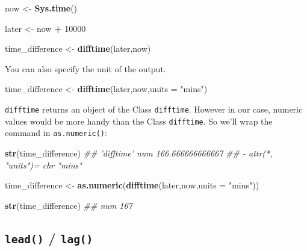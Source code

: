 \documentclass[]{book}
\newenvironment{Shaded}{\begin{snugshade}}{\end{snugshade}}
\newcommand{\CommentTok}[1]{\textcolor[rgb]{0.56,0.35,0.01}{\textit{#1}}}
\newcommand{\DataTypeTok}[1]{\textcolor[rgb]{0.13,0.29,0.53}{#1}}
\newcommand{\DecValTok}[1]{\textcolor[rgb]{0.00,0.00,0.81}{#1}}
\newcommand{\KeywordTok}[1]{\textcolor[rgb]{0.13,0.29,0.53}{\textbf{#1}}}
\newcommand{\NormalTok}[1]{#1}
\newcommand{\OperatorTok}[1]{\textcolor[rgb]{0.81,0.36,0.00}{\textbf{#1}}}
\newcommand{\StringTok}[1]{\textcolor[rgb]{0.31,0.60,0.02}{#1}}
\begin{document}
\begin{Shaded}
\begin{Highlighting}[]
\NormalTok{now <-}\StringTok{ }\KeywordTok{Sys.time}\NormalTok{()}

\NormalTok{later <-}\StringTok{ }\NormalTok{now }\OperatorTok{+}\StringTok{ }\DecValTok{10000}

\NormalTok{time_difference <-}\StringTok{ }\KeywordTok{difftime}\NormalTok{(later,now)}
\end{Highlighting}
\end{Shaded}

You can also specify the unit of the output.

\begin{Shaded}
\begin{Highlighting}[]
\NormalTok{time_difference <-}\StringTok{ }\KeywordTok{difftime}\NormalTok{(later,now,}\DataTypeTok{units =} \StringTok{"mins"}\NormalTok{)}
\end{Highlighting}
\end{Shaded}

\texttt{difftime} returns an object of the Class \texttt{difftime}. However in our case, numeric values would be more handy than the Class \texttt{difftime}. So we'll wrap the command in \texttt{as.numeric()}:

\begin{Shaded}
\begin{Highlighting}[]
\KeywordTok{str}\NormalTok{(time_difference)}
\CommentTok{##  'difftime' num 166.666666666667}
\CommentTok{##  - attr(*, "units")= chr "mins"}
\end{Highlighting}
\end{Shaded}

\begin{Shaded}
\begin{Highlighting}[]
\NormalTok{time_difference <-}\StringTok{ }\KeywordTok{as.numeric}\NormalTok{(}\KeywordTok{difftime}\NormalTok{(later,now,}\DataTypeTok{units =} \StringTok{"mins"}\NormalTok{))}

\KeywordTok{str}\NormalTok{(time_difference)}
\CommentTok{##  num 167}
\end{Highlighting}
\end{Shaded}

\hypertarget{lead-lag}{%
\subsection{\texorpdfstring{\texttt{lead()} / \texttt{lag()}}{lead() / lag()}}\label{lead-lag}}
\end{document}
